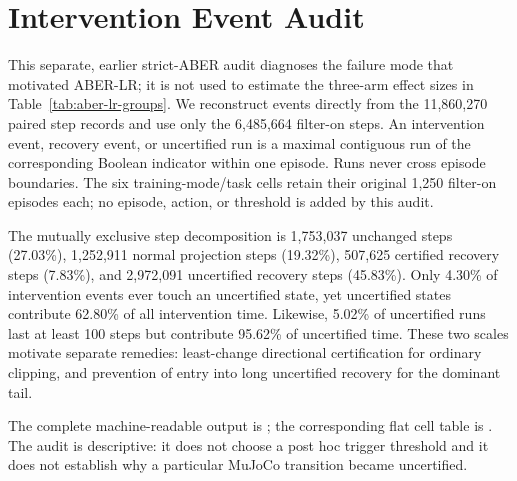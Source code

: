\section{Intervention Event Audit}

\renewcommand{\thefigure}{S\arabic{figure}}
\setcounter{figure}{0}

This separate, earlier strict-ABER audit diagnoses the failure mode that
motivated ABER-LR; it is not used to estimate the three-arm effect sizes in
Table~\ref{tab:aber-lr-groups}.  We reconstruct events directly from the
11,860,270 paired step records and
use only the 6,485,664 filter-on steps.  An intervention event, recovery
event, or uncertified run is a maximal contiguous run of the corresponding
Boolean indicator within one episode.  Runs never cross episode boundaries.
The six training-mode/task cells retain their original 1,250 filter-on
episodes each; no episode, action, or threshold is added by this audit.



The mutually exclusive step decomposition is 1,753,037 unchanged steps
(27.03\%), 1,252,911 normal projection steps (19.32\%), 507,625 certified
recovery steps (7.83\%), and 2,972,091 uncertified recovery steps (45.83\%).
Only 4.30\% of intervention events ever touch an uncertified state, yet
uncertified states contribute 62.80\% of all intervention time.  Likewise,
5.02\% of uncertified runs last at least 100 steps but contribute 95.62\% of
uncertified time.  These two scales motivate separate remedies: least-change
directional certification for ordinary clipping, and prevention of entry
into long uncertified recovery for the dominant tail.

The complete machine-readable output is
; the corresponding flat
cell table is .  The audit
is descriptive: it does not choose a post hoc trigger threshold and it does
not establish why a particular MuJoCo transition became uncertified.
